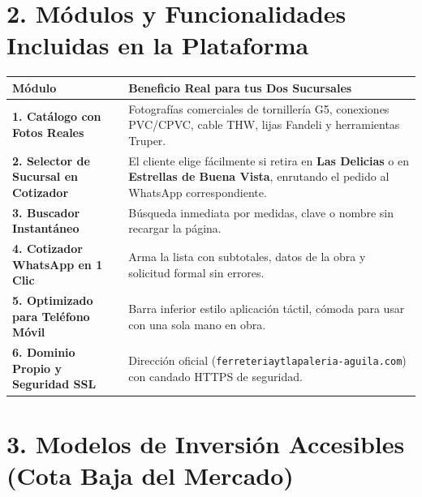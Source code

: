 \documentclass[10pt,letterpaper]{article}
\begin{document}
\vspace{0.05cm}

\section*{2. Módulos y Funcionalidades Incluidas en la Plataforma}

\noindent\begin{tabularx}{\textwidth}{@{}l X@{}}
    \toprule
    \textbf{Módulo} & \textbf{Beneficio Real para tus Dos Sucursales} \\
    \midrule
    \textbf{1. Catálogo con Fotos Reales} & Fotografías comerciales de tornillería G5, conexiones PVC/CPVC, cable THW, lijas Fandeli y herramientas Truper. \\
    \addlinespace[1.5pt]
    \textbf{2. Selector de Sucursal en Cotizador} & El cliente elige fácilmente si retira en \textbf{Las Delicias} o en \textbf{Estrellas de Buena Vista}, enrutando el pedido al WhatsApp correspondiente. \\
    \addlinespace[1.5pt]
    \textbf{3. Buscador Instantáneo} & Búsqueda inmediata por medidas, clave o nombre sin recargar la página. \\
    \addlinespace[1.5pt]
    \textbf{4. Cotizador WhatsApp en 1 Clic} & Arma la lista con subtotales, datos de la obra y solicitud formal sin errores. \\
    \addlinespace[1.5pt]
    \textbf{5. Optimizado para Teléfono Móvil} & Barra inferior estilo aplicación táctil, cómoda para usar con una sola mano en obra. \\
    \addlinespace[1.5pt]
    \textbf{6. Dominio Propio y Seguridad SSL} & Dirección oficial (\texttt{ferreteriaytlapaleria-aguila.com}) con candado HTTPS de seguridad. \\
    \bottomrule
\end{tabularx}

\vspace{0.1cm}

\section*{3. Modelos de Inversión Accesibles (Cota Baja del Mercado)}
\end{document}
